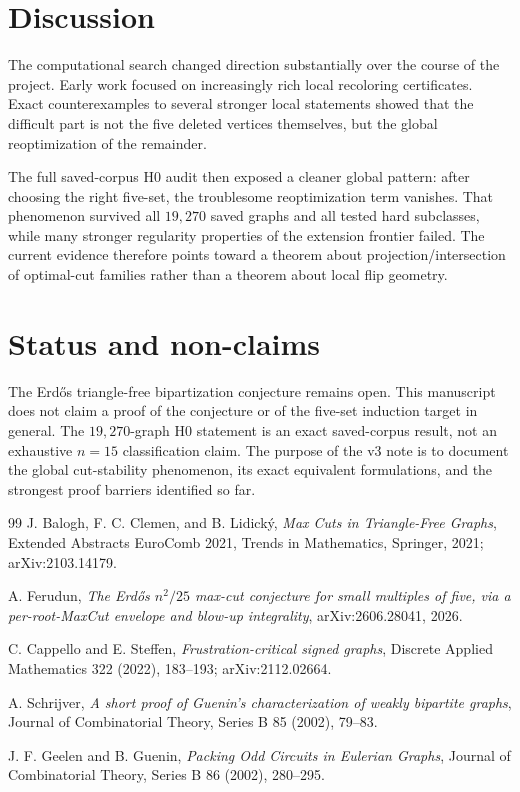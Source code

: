 \documentclass[11pt]{article}
\begin{document}
\section{Discussion}

The computational search changed direction substantially over the course
of the project.  Early work focused on increasingly rich local recoloring
certificates.  Exact counterexamples to several stronger local statements
showed that the difficult part is not the five deleted vertices themselves,
but the global reoptimization of the remainder.

The full saved-corpus H0 audit then exposed a cleaner global pattern: after
choosing the right five-set, the troublesome reoptimization term vanishes.
That phenomenon survived all $19{,}270$ saved graphs and all tested hard
subclasses, while many stronger regularity properties of the extension
frontier failed.  The current evidence therefore points toward a theorem
about projection/intersection of optimal-cut families rather than a theorem
about local flip geometry.

\section*{Status and non-claims}

The Erd\H{o}s triangle-free bipartization conjecture remains open.  This
manuscript does not claim a proof of the conjecture or of the five-set
induction target in general.  The $19{,}270$-graph H0 statement is an exact
saved-corpus result, not an exhaustive $n=15$ classification claim.  The
purpose of the v3 note is to document the global cut-stability phenomenon,
its exact equivalent formulations, and the strongest proof barriers
identified so far.

\begin{thebibliography}{99}
J. Balogh, F. C. Clemen, and B. Lidick\'y,
\emph{Max Cuts in Triangle-Free Graphs},
Extended Abstracts EuroComb 2021, Trends in Mathematics, Springer, 2021;
arXiv:2103.14179.

A. Ferudun,
\emph{The Erd\H{o}s $n^2/25$ max-cut conjecture for small multiples of five,
via a per-root-MaxCut envelope and blow-up integrality},
arXiv:2606.28041, 2026.

C. Cappello and E. Steffen,
\emph{Frustration-critical signed graphs},
Discrete Applied Mathematics 322 (2022), 183--193;
arXiv:2112.02664.

A. Schrijver,
\emph{A short proof of Guenin's characterization of weakly bipartite graphs},
Journal of Combinatorial Theory, Series B 85 (2002), 79--83.

J. F. Geelen and B. Guenin,
\emph{Packing Odd Circuits in Eulerian Graphs},
Journal of Combinatorial Theory, Series B 86 (2002), 280--295.
\end{thebibliography}
\end{document}
